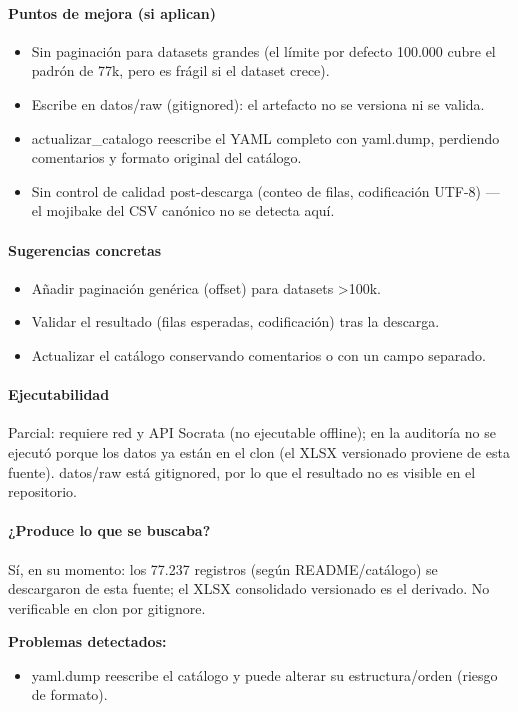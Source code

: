 \paragraph{Puntos de mejora (si aplican)}
\begin{itemize}
  \item Sin paginación para datasets grandes (el límite por defecto 100.000 cubre el padrón de 77k, pero es frágil si el dataset crece).
  \item Escribe en datos/raw (gitignored): el artefacto no se versiona ni se valida.
  \item actualizar\_catalogo reescribe el YAML completo con yaml.dump, perdiendo comentarios y formato original del catálogo.
  \item Sin control de calidad post-descarga (conteo de filas, codificación UTF-8) --- el mojibake del CSV canónico no se detecta aquí.
\end{itemize}

\paragraph{Sugerencias concretas}
\begin{itemize}
  \item Añadir paginación genérica (offset) para datasets >100k.
  \item Validar el resultado (filas esperadas, codificación) tras la descarga.
  \item Actualizar el catálogo conservando comentarios o con un campo separado.
\end{itemize}

\paragraph{Ejecutabilidad}
Parcial: requiere red y API Socrata (no ejecutable offline); en la auditoría no se ejecutó porque los datos ya están en el clon (el XLSX versionado proviene de esta fuente). datos/raw está gitignored, por lo que el resultado no es visible en el repositorio.

\paragraph{¿Produce lo que se buscaba?}
Sí, en su momento: los 77.237 registros (según README/catálogo) se descargaron de esta fuente; el XLSX consolidado versionado es el derivado. No verificable en clon por gitignore.

\begin{tcolorbox}[riesgo]
\textbf{Problemas detectados:}
\begin{itemize}
  \item yaml.dump reescribe el catálogo y puede alterar su estructura/orden (riesgo de formato).
\end{itemize}
\end{tcolorbox}

